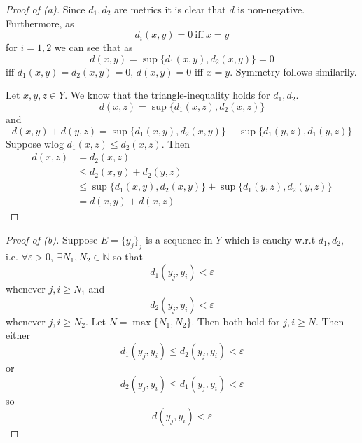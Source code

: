 \begin{proof}[Proof of (a)]
    Since $d_1,d_2$ are metrics it is clear that $d$ is non-negative.
    Furthermore, as 
    \[
        d_i(x,y) = 0 \ \text{iff} \ x = y 
    \]
    for $i = 1,2$ we can see that as
    \[
        d(x,y) = \sup\{d_1(x,y),d_2(x,y)\} = 0
    \]
    iff $d_1(x,y) = d_2(x,y) = 0$, $d(x,y) = 0$ iff $x = y$. 
    Symmetry follows similarily. 

    Let $x,y,z \in Y$. We know that the triangle-inequality holds 
    for $d_1,d_2$. 
    \[
        d(x,z) = \sup\{d_1(x,z),d_2(x,z)\}
    \]
    and 
    \[
        d(x,y) + d(y,z) = \sup\{d_1(x,y),d_2(x,y)\} + 
        \sup\{d_1(y,z), d_1(y,z)\}
    \]
    Suppose wlog $d_1(x,z) \leq d_2(x,z)$. Then 
    \begin{align*}
        d(x,z) &= d_2(x,z) \\
               &\leq d_2(x,y) + d_2(y,z) \\ 
               &\leq \sup\{d_1(x,y),d_2(x,y)\} + \sup\{d_1(y,z), 
               d_2(y,z)\} \\ 
               &= d(x,y) + d(x,z)
    \end{align*}
\end{proof}
\begin{proof}[Proof of (b)]
    Suppose $E = \{y_j\}_j$ is a sequence in $Y$ which is cauchy 
    w.r.t $d_1,d_2$, i.e. $\forall \varepsilon > 0, \: \exists 
    N_1,N_2 \in \mathbb N$ so that 
    \[
        d_1(y_j, y_i) < \varepsilon
    \]
    whenever $j,i \geq N_1$ and 
    \[
        d_2(y_j,y_i) < \varepsilon 
    \]
    whenever $j,i \geq N_2$.
    Let $N = \max\{N_1,N_2\}$. Then both hold for $j,i \geq N$.
    Then either 
    \[
        d_1(y_j,y_i) \leq d_2(y_j,y_i) < \varepsilon
    \]
    or 
    \[
        d_2(y_j,y_i) \leq d_1(y_j,y_i) < \varepsilon 
    \]
    so 
    \[
        d(y_j,y_i) < \varepsilon
    \]
\end{proof}

\newpage 
